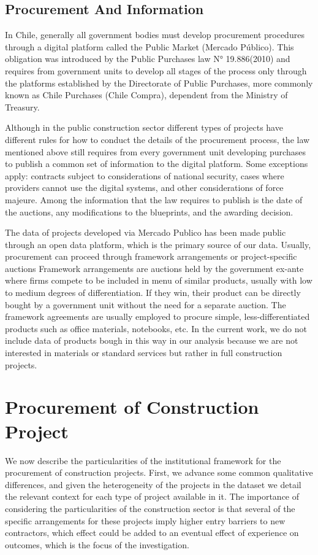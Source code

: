 \subsection{Procurement And Information}
In Chile, generally all government bodies must develop procurement procedures through a digital platform called the Public Market (Mercado Público).  This obligation was introduced by the Public Purchases law N° 19.886(2010) and requires from government units to develop all stages of the process only through the platforms established by the Directorate of Public Purchases, more commonly known as Chile Purchases (Chile Compra), dependent from the Ministry of Treasury.

Although in the public construction sector different types of projects have different rules for how to conduct the details of the procurement process, the law mentioned above still requires from every government unit developing purchases to publish a common set of information to the digital platform. Some exceptions apply: contracts subject to considerations of national security, cases where providers cannot use the digital systems, and other considerations of force majeure. Among the information that the law requires to publish is the date of the auctions, any modifications to the blueprints, and the awarding decision.

The data of projects developed via Mercado Publico has been made public through an open data platform, which is the primary source of our data.
Usually, procurement can proceed through framework arrangements or project-specific auctions Framework arrangements are auctions held by the government ex-ante where firms compete to be included in menu of similar products, usually with low to medium degrees of differentiation. If they win, their product can be directly bought by a government unit without the need for a separate auction. The framework agreements are usually employed to procure simple, less-differentiated products such as office materials, notebooks, etc. In the current work, we do not include data of products bough in this way in our analysis because we are not interested in materials or standard services but rather in full construction projects.

\section{Procurement of Construction Project}
We now describe the particularities of the institutional framework for the procurement of construction projects. First, we advance some common qualitative differences, and given the heterogeneity of the projects in the dataset we detail the relevant context for each type of project available in it. The importance of considering the particularities of the construction sector is that several of the specific arrangements for these projects imply higher entry barriers to new contractors, which effect could be added to an eventual effect of experience on outcomes, which is the focus of the investigation.

